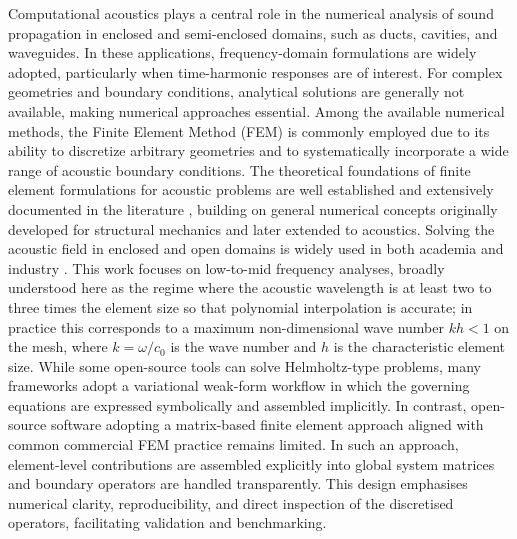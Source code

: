 \documentclass{jors}
\begin{document}
Computational acoustics plays a central role in the numerical analysis of sound propagation in enclosed and semi-enclosed domains, such as ducts, cavities, and waveguides. In these applications, frequency-domain formulations are widely adopted, particularly when time-harmonic responses are of interest. For complex geometries and boundary conditions, analytical solutions are generally not available, making numerical approaches essential. Among the available numerical methods, the Finite Element Method (FEM) is commonly employed due to its ability to discretize arbitrary geometries and to systematically incorporate a wide range of acoustic boundary conditions. The theoretical foundations of finite element formulations for acoustic problems are well established and extensively documented in the literature \cite{MacNeal1994,Desmet1999,Ihlenburg1995,Babuska1988,Prinn2023}, building on general numerical concepts originally developed for structural mechanics and later extended to acoustics. Solving the acoustic field in enclosed and open domains is widely used in both academia and industry \cite{HelmholtzResonator2012,Thompson2006,Harari2006,Khalefa2024}. This work focuses on low-to-mid frequency analyses, broadly understood here as the regime where the acoustic wavelength is at least two to three times the element size so that polynomial interpolation is accurate; in practice this corresponds to a maximum non-dimensional wave number $kh < 1$ on the mesh, where $k = \omega/c_0$ is the wave number and $h$ is the characteristic element size. While some open-source tools can solve Helmholtz-type problems, many frameworks adopt a variational weak-form workflow in which the governing equations are expressed symbolically and assembled implicitly. In contrast, open-source software adopting a matrix-based finite element approach aligned with common commercial FEM practice remains limited. In such an approach, element-level contributions are assembled explicitly into global system matrices and boundary operators are handled transparently. This design emphasises numerical clarity, reproducibility, and direct inspection of the discretised operators, facilitating validation and benchmarking.
\end{document}
